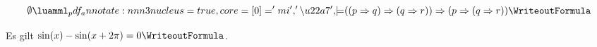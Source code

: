 \documentclass{article}
\begin{document}
\[
  \emptyset\models((p\Rightarrow q)\Rightarrow(q\Rightarrow r))\Rightarrow (p\Rightarrow (q\Rightarrow r))
  \WriteoutFormula
\]


Es gilt $\sin(x)-\sin(x+2\pi)=0\WriteoutFormula$.
\end{document}
